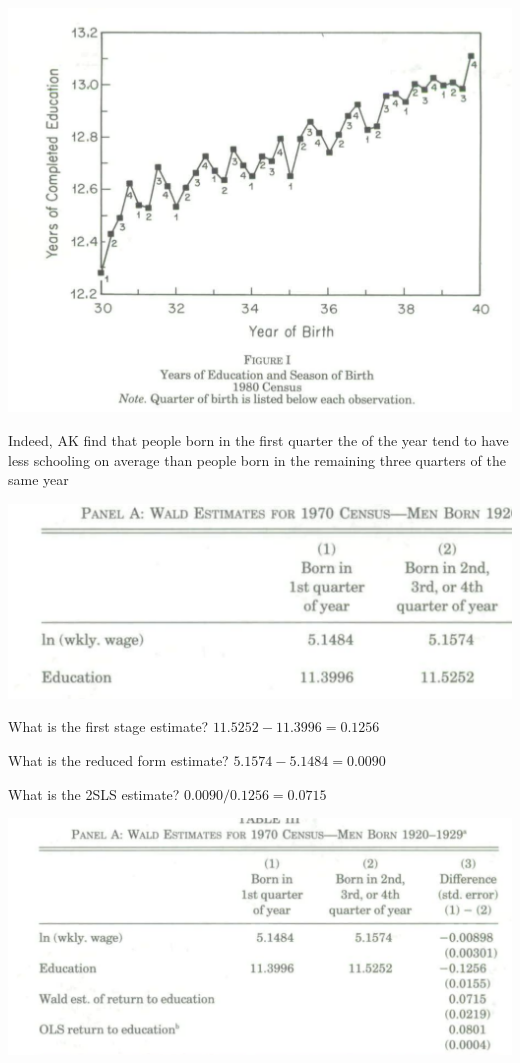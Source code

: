 \documentclass[11pt,english,handout]{beamer}
\newenvironment{wideitemize}{\itemize\addtolength{\itemsep}{10pt}}{\enditemize}
\begin{document}
\begin{frame}{}
	\centering
	\includegraphics[width = 0.7 \linewidth]{ak-first-stage-graph}
	
	\begin{wideitemize}
		\item
		Indeed, AK find that people born in the first quarter the of the year tend to have less schooling on average than people born in the remaining three quarters of the same year
	\end{wideitemize}
\end{frame}

\begin{frame}
	\includegraphics[width = 0.7 \linewidth]{ak-first-stage-basic}
	
	\pause
	\begin{wideitemize}
		\item
		What is the first stage estimate? \pause{} $11.5252 - 11.3996 = 0.1256$
		
		\pause
		\item
		What is the reduced form estimate? \pause{} $5.1574 - 5.1484 = 0.0090$
		
		\pause
		\item
		What is the 2SLS estimate? \pause{} $0.0090 / 0.1256 = 0.0715$
	\end{wideitemize}
\end{frame}


\begin{frame}
		\includegraphics[width = 0.9 \linewidth]{ak-first-stage}
\end{frame}
\end{document}
